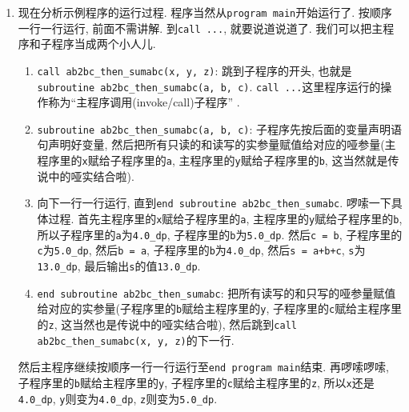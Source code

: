 \begin{enumerate}
    \item 现在分析示例程序的运行过程. 程序当然从\texttt{program main}开始运行了. 按顺序一行一行运行, 前面不需讲解. 到\texttt{call ...}, 就要说道说道了. 我们可以把主程序和子程序当成两个小人儿.\begin{enumerate}
        \item \texttt{call ab2bc\_{}then\_{}sumabc(x, y, z)}: 跳到子程序的开头, 也就是\texttt{subroutine ab2bc\_{}then\_{}sumabc(a, b, c)}. \texttt{call ...}这里程序运行的操作称为``主程序调用(invoke/call)子程序'' .
        \item \texttt{subroutine ab2bc\_{}then\_{}sumabc(a, b, c)}: 子程序先按后面的变量声明语句声明好变量, 然后把所有只读的和读写的实参量赋值给对应的哑参量(主程序里的\texttt{x}赋给子程序里的\texttt{a}, 主程序里的\texttt{y}赋给子程序里的\texttt{b}, 这当然就是传说中的哑实结合啦).
        \item 向下一行一行运行, 直到\texttt{end subroutine ab2bc\_{}then\_{}sumabc}. 啰嗦一下具体过程. 首先主程序里的\texttt{x}赋给子程序里的\texttt{a}, 主程序里的\texttt{y}赋给子程序里的\texttt{b}, 所以子程序里的\texttt{a}为\texttt{4.0\_{}dp}, 子程序里的\texttt{b}为\texttt{5.0\_{}dp}. 然后\texttt{c = b}, 子程序里的\texttt{c}为\texttt{5.0\_{}dp}, 然后\texttt{b = a}, 子程序里的\texttt{b}为\texttt{4.0\_{}dp}, 然后\texttt{s = a+b+c}, \texttt{s}为\texttt{13.0\_{}dp}, 最后输出\texttt{s}的值\texttt{13.0\_{}dp}.
        \item \texttt{end subroutine ab2bc\_{}then\_{}sumabc}: 把所有读写的和只写的哑参量赋值给对应的实参量(子程序里的\texttt{b}赋给主程序里的\texttt{y}, 子程序里的\texttt{c}赋给主程序里的\texttt{z}, 这当然也是传说中的哑实结合啦), 然后跳到\texttt{call ab2bc\_{}then\_{}sumabc(x, y, z)}的下一行.
    \end{enumerate}然后主程序继续按顺序一行一行运行至\texttt{end program main}结束. 再啰嗦啰嗦, 子程序里的\texttt{b}赋给主程序里的\texttt{y}, 子程序里的\texttt{c}赋给主程序里的\texttt{z}, 所以\texttt{x}还是\texttt{4.0\_{}dp}, \texttt{y}则变为\texttt{4.0\_{}dp}, \texttt{z}则变为\texttt{5.0\_{}dp}.
\end{enumerate}

